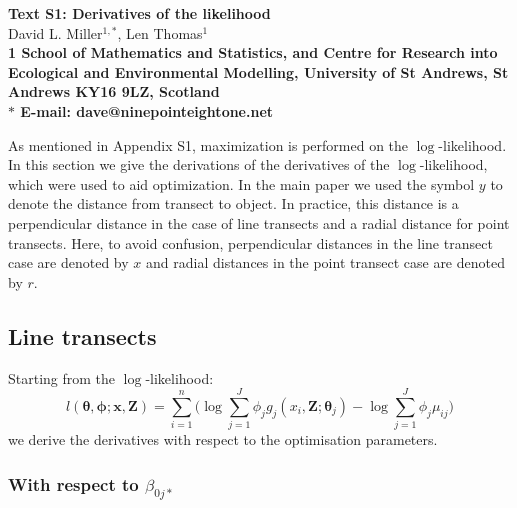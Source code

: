 \documentclass[10pt]{article}
\date{}
\begin{document}
\begin{flushleft}
{\Large
\textbf{Text S1: Derivatives of the likelihood}
}
\\
David L. Miller$^{1,\ast}$,
Len Thomas$^{1}$
\\
\bf{1} School of Mathematics and Statistics, and Centre for Research into Ecological and Environmental Modelling, University of St Andrews, St Andrews KY16 9LZ, Scotland
\\
$\ast$ E-mail: dave@ninepointeightone.net
\end{flushleft}


As mentioned in Appendix S1, maximization is performed on the $\log$-likelihood. In this section we give the derivations of the derivatives of the $\log$-likelihood, which were used to aid optimization. In the main paper we used the symbol $y$ to denote the distance from transect to object.  In practice, this distance is a perpendicular distance in the case of line transects and a radial distance for point transects.  Here, to avoid confusion, perpendicular distances in the line transect case are denoted by $x$ and radial distances in the point transect case are denoted by $r$.

\subsection*{Line transects}

Starting from the $\log$-likelihood:
\begin{equation}
l(\boldsymbol{\theta}, \boldsymbol{\phi}; \mathbf{x},\mathbf{Z}) = \sum_{i=1}^n \Big( \log \sum_{j=1}^J \phi_j g_j(x_i,\mathbf{Z}; \boldsymbol{\theta}_j) - \log \sum_{j=1}^J \phi_j \mu_{ij}\Big)
\label{lt-lik}
\end{equation}
we derive the derivatives with respect to the optimisation parameters.

\subsubsection*{With respect to $\beta_{0j*}$}
\end{document}

